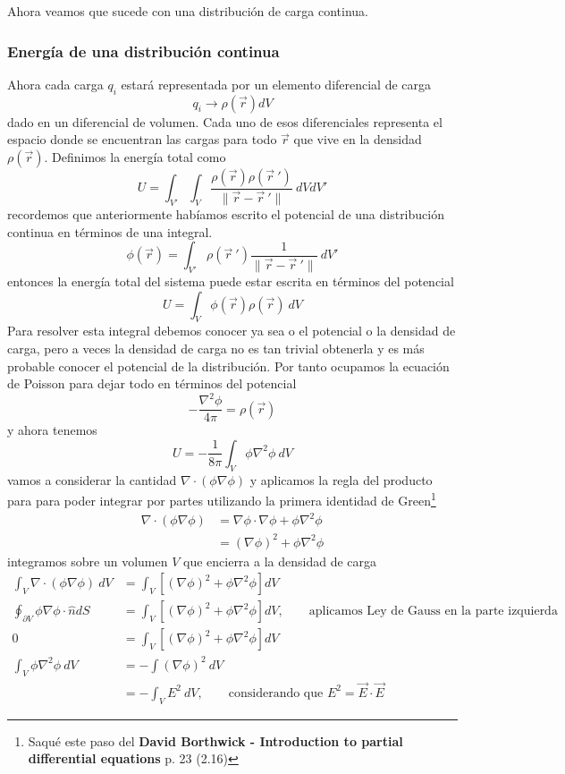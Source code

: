 \documentclass[11pt,a4paper]{article}
\begin{document}
Ahora veamos que sucede con una distribución de carga continua.
\subsubsection{Energía de una distribución continua}
Ahora cada carga $q_i$ estará representada por un elemento diferencial de carga
$$q_i\to\rho(\vec{r})dV$$
dado en un diferencial de volumen. Cada uno de esos diferenciales representa el espacio donde se encuentran las cargas para todo $\vec{r}$ que vive en la densidad $\rho(\vec{r})$. Definimos la energía total como
$$U=\int_{V'}\int_V\frac{\rho(\vec{r})\rho(\vec{r}\ ')}{\|\vec{r}-\vec{r}\ '\|}\ dVdV'$$
recordemos que anteriormente habíamos escrito el potencial de una distribución continua en términos de una integral.
$$\phi(\vec{r})=\int_{V'}\rho(\vec{r}\ ')\frac{1}{\|\vec{r}-\vec{r}\ '\|}\ dV'$$
entonces la energía total del sistema puede estar escrita en términos del potencial
\begin{equation}\label{eq:energiaContinua}
U=\int_V\phi(\vec{r})\rho(\vec{r})\ dV
\end{equation}
Para resolver esta integral debemos conocer ya sea o el potencial o la densidad de carga, pero a veces la densidad de carga no es tan trivial obtenerla y es más probable conocer el potencial de la distribución. Por tanto ocupamos la ecuación de Poisson para  dejar todo en términos del potencial
$$-\frac{\nabla^2\phi}{4\pi}=\rho(\vec{r})$$ 
y ahora tenemos
$$U=-\frac{1}{8\pi}\int_V\phi\nabla^2\phi\ dV$$
vamos a considerar la cantidad $\nabla\cdot(\phi\nabla\phi)$ y aplicamos la regla del producto para para poder integrar por partes utilizando la primera identidad de Green\footnote{Saqué este paso del \textbf{David Borthwick - Introduction to partial differential equations} p. 23 (2.16)}
\begin{align*}
\nabla\cdot(\phi\nabla\phi)&=\nabla\phi\cdot\nabla\phi+\phi\nabla^2\phi\\
&=(\nabla\phi)^2+\phi\nabla^2\phi
\end{align*}
integramos sobre un volumen $V$ que encierra a la densidad de carga
\begin{align*}
\int_V\nabla\cdot(\phi\nabla\phi)\ dV&=\int_V\left[(\nabla\phi)^2+\phi\nabla^2\phi\right]dV \\
\oint_{\partial V}\phi\nabla\phi\cdot\hat{n} dS&=\int_V\left[(\nabla\phi)^2+\phi\nabla^2\phi\right]dV,\qquad\text{aplicamos Ley de Gauss en la parte izquierda} \\
0&=\int_V\left[(\nabla\phi)^2+\phi\nabla^2\phi\right]dV \\
\int_V\phi\nabla^2\phi\ dV&=-\int(\nabla\phi)^2\ dV\\
&=-\int_V E^2\ dV,\qquad\text{considerando que }E^2=\vec{E}\cdot\vec{E}
\end{align*}
\end{document}
